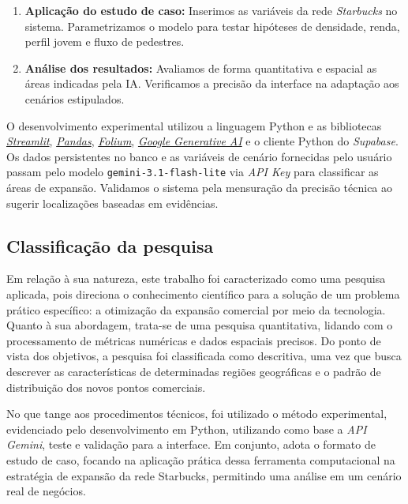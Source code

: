 \begin{enumerate}
\item \textbf{Aplicação do estudo de caso:} Inserimos as variáveis da rede \textit{Starbucks} no sistema. Parametrizamos o modelo para testar hipóteses de densidade, renda, perfil jovem e fluxo de pedestres.

\item \textbf{Análise dos resultados:} Avaliamos de forma quantitativa e espacial as áreas indicadas pela IA. Verificamos a precisão da interface na adaptação aos cenários estipulados.
\end{enumerate}

O desenvolvimento experimental utilizou a linguagem Python e as bibliotecas \href{https://streamlit.io/}{\textit{Streamlit}}, \href{https://pandas.pydata.org/}{\textit{Pandas}}, \href{https://python-visualization.github.io/folium/}{\textit{Folium}}, \href{https://ai.google.dev/api/python/google/generativeai}{\textit{Google Generative AI}} e o cliente Python do \textit{Supabase}. Os dados persistentes no banco e as variáveis de cenário fornecidas pelo usuário passam pelo modelo \texttt{gemini-3.1-flash-lite} via \textit{API Key} para classificar as áreas de expansão. Validamos o sistema pela mensuração da precisão técnica ao sugerir localizações baseadas em evidências.


\subsection{\esp Classificação da pesquisa}
Em relação à sua natureza, este trabalho foi caracterizado como uma pesquisa aplicada, pois direciona o conhecimento científico para a solução de um problema prático específico: a otimização da expansão comercial por meio da tecnologia. Quanto à sua abordagem, trata-se de uma pesquisa quantitativa, lidando com o processamento de métricas numéricas e dados espaciais precisos. Do ponto de vista dos objetivos, a pesquisa foi classificada como descritiva, uma vez que busca descrever as características de determinadas regiões geográficas e o padrão de distribuição dos novos pontos comerciais.

No que tange aos procedimentos técnicos, foi utilizado o método experimental, evidenciado pelo desenvolvimento em Python, utilizando como base a \textit{API} \textit{Gemini}, teste e validação para a interface. Em conjunto, adota o formato de estudo de caso, focando na aplicação prática dessa ferramenta computacional na estratégia de expansão da rede Starbucks, permitindo uma análise em um cenário real de negócios.



